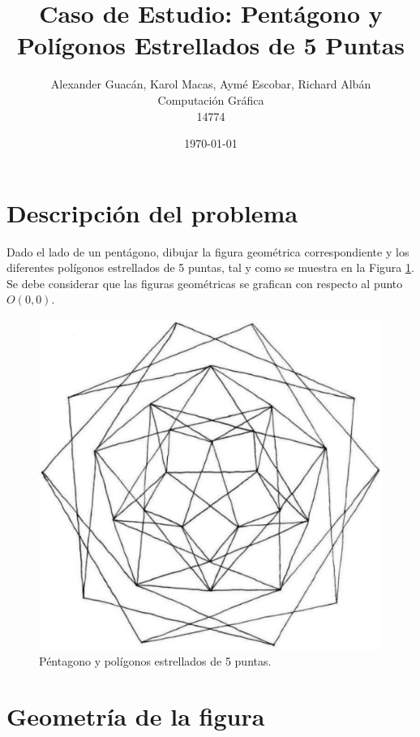 \documentclass[oneside, a4paper]{article}
\title{Caso de Estudio: Pentágono y Polígonos Estrellados de 5 Puntas}
\author{
    Alexander Guacán, Karol Macas, Aymé Escobar, Richard Albán\\
    Computación Gráfica\\
    14774
}
\date{\today}
\begin{document}
    \pagestyle{fancy}

    \begin{titlepage}
        \maketitle
    \end{titlepage}

    \section{Descripción del problema}
        Dado el lado de un pentágono, dibujar la figura geométrica correspondiente y los diferentes polígonos estrellados de 5 puntas, tal y como se muestra en la Figura \ref{fig:star_pentagon}. Se debe considerar que las figuras geométricas se grafican con respecto al punto $O(0,0)$.

        \begin{figure}[H]
            \centering
            \includegraphics[scale=0.5]{star_pentagon.png}
            \caption{Péntagono y polígonos estrellados de 5 puntas.}
            \label{fig:star_pentagon}
        \end{figure}

    \section{Geometría de la figura}
\end{document}
